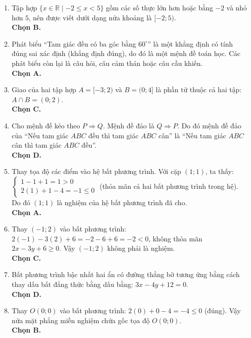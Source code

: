 \documentclass[12pt,a4paper]{article}
\begin{document}
\begin{enumerate}
\item Tập hợp $\{x \in \mathbb{R} \mid -2 \le x < 5\}$ gồm các số thực lớn hơn hoặc bằng $-2$ và nhỏ hơn $5$, nên được viết dưới dạng nửa khoảng là $[-2; 5)$.\\
\textbf{Chọn B.}

\item Phát biểu ``Tam giác đều có ba góc bằng $60^\circ$'' là một khẳng định có tính đúng sai xác định (khẳng định đúng), do đó là một mệnh đề toán học. Các phát biểu còn lại là câu hỏi, câu cảm thán hoặc câu cầu khiến.\\
\textbf{Chọn A.}

\item Giao của hai tập hợp $A = [-3; 2)$ và $B = (0; 4]$ là phần tử thuộc cả hai tập: $A \cap B = (0; 2)$.\\
\textbf{Chọn C.}

\item Cho mệnh đề kéo theo $P \Rightarrow Q$. Mệnh đề đảo là $Q \Rightarrow P$. Do đó mệnh đề đảo của ``Nếu tam giác $ABC$ đều thì tam giác $ABC$ cân'' là ``Nếu tam giác $ABC$ cân thì tam giác $ABC$ đều''.\\
\textbf{Chọn D.}

\item Thay tọa độ các điểm vào hệ bất phương trình. Với cặp $(1; 1)$, ta thấy:\\
$\begin{cases} 1 - 1 + 1 = 1 > 0 \\ 2(1) + 1 - 4 = -1 \le 0 \end{cases}$ (thỏa mãn cả hai bất phương trình trong hệ).\\
Do đó $(1; 1)$ là nghiệm của hệ bất phương trình đã cho.\\
\textbf{Chọn A.}

\item Thay $(-1; 2)$ vào bất phương trình: $2(-1) - 3(2) + 6 = -2 - 6 + 6 = -2 < 0$, không thỏa mãn $2x - 3y + 6 \ge 0$. Vậy $(-1; 2)$ không phải là nghiệm.\\
\textbf{Chọn C.}

\item Bất phương trình bậc nhất hai ẩn có đường thẳng bờ tương ứng bằng cách thay dấu bất đẳng thức bằng dấu bằng: $3x - 4y + 12 = 0$.\\
\textbf{Chọn D.}

\item Thay $O(0; 0)$ vào bất phương trình: $2(0) + 0 - 4 = -4 \le 0$ (đúng). Vậy nửa mặt phẳng miền nghiệm chứa gốc tọa độ $O(0; 0)$.\\
\textbf{Chọn B.}


\end{enumerate}
\end{document}
